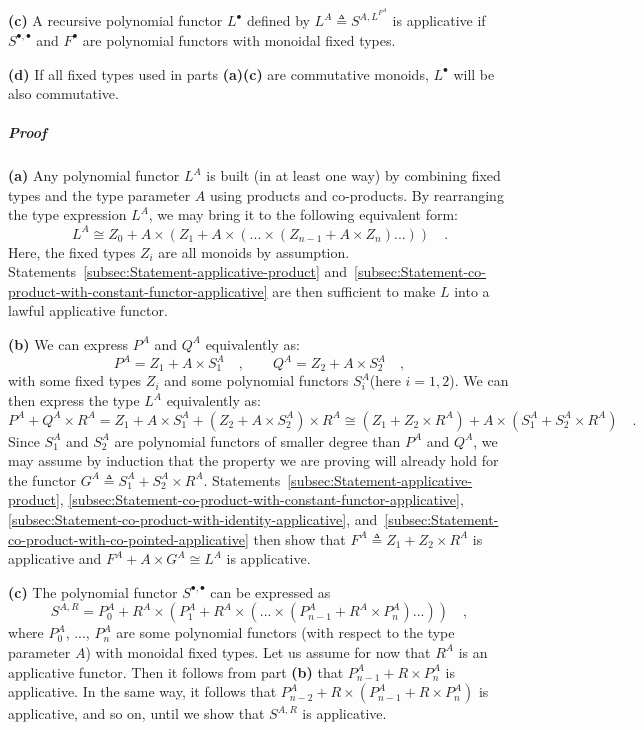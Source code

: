 \textbf{(c)} A recursive polynomial functor $L^{\bullet}$ defined
by $L^{A}\triangleq S^{A,L^{F^{A}}}$ is applicative if $S^{\bullet,\bullet}$
and $F^{\bullet}$ are polynomial functors with monoidal fixed types.

\textbf{(d)} If all fixed types used in parts \textbf{(a)}\textendash \textbf{(c)}
are commutative monoids, $L^{\bullet}$ will be also commutative.

\subparagraph{Proof}

\textbf{(a)} Any polynomial functor $L^{A}$ is built (in at least
one way) by combining fixed types and the type parameter $A$ using
products and co-products. By rearranging the type expression $L^{A}$,
we may bring it to the following equivalent form:
\[
L^{A}\cong Z_{0}+A\times(Z_{1}+A\times(...\times(Z_{n-1}+A\times Z_{n})...))\quad.
\]
Here, the fixed types $Z_{i}$ are all monoids by assumption. Statements~\ref{subsec:Statement-applicative-product}
and~\ref{subsec:Statement-co-product-with-constant-functor-applicative}
are then sufficient to make $L$ into a lawful applicative functor. 

\textbf{(b)} We can express $P^{A}$ and $Q^{A}$ equivalently as:
\[
P^{A}=Z_{1}+A\times S_{1}^{A}\quad,\quad\quad Q^{A}=Z_{2}+A\times S_{2}^{A}\quad,
\]
with some fixed types $Z_{i}$ and some polynomial functors $S_{i}^{A}$(here
$i=1,2$). We can then express the type $L^{A}$ equivalently as:
\[
P^{A}+Q^{A}\times R^{A}=Z_{1}+A\times S_{1}^{A}+(Z_{2}+A\times S_{2}^{A})\times R^{A}\cong(Z_{1}+Z_{2}\times R^{A})+A\times(S_{1}^{A}+S_{2}^{A}\times R^{A})\quad.
\]
Since $S_{1}^{A}$ and $S_{2}^{A}$ are polynomial functors of smaller
degree than $P^{A}$ and $Q^{A}$, we may assume by induction that
the property we are proving will already hold for the functor $G^{A}\triangleq S_{1}^{A}+S_{2}^{A}\times R^{A}$.
Statements~\ref{subsec:Statement-applicative-product}, \ref{subsec:Statement-co-product-with-constant-functor-applicative},
\ref{subsec:Statement-co-product-with-identity-applicative}, and~\ref{subsec:Statement-co-product-with-co-pointed-applicative}
then show that $F^{A}\triangleq Z_{1}+Z_{2}\times R^{A}$ is applicative
and $F^{A}+A\times G^{A}\cong L^{A}$ is applicative.

\textbf{(c)} The polynomial functor $S^{\bullet,\bullet}$ can be
expressed as
\[
S^{A,R}=P_{0}^{A}+R^{A}\times(P_{1}^{A}+R^{A}\times(...\times(P_{n-1}^{A}+R^{A}\times P_{n}^{A})...))\quad,
\]
where $P_{0}^{A}$, ..., $P_{n}^{A}$ are some polynomial functors
(with respect to the type parameter $A$) with monoidal fixed types.
Let us assume for now that $R^{A}$ is an applicative functor. Then
it follows from part \textbf{(b)} that $P_{n-1}^{A}+R\times P_{n}^{A}$
is applicative. In the same way, it follows that $P_{n-2}^{A}+R\times(P_{n-1}^{A}+R\times P_{n}^{A})$
is applicative, and so on, until we show that $S^{A,R}$ is applicative.

